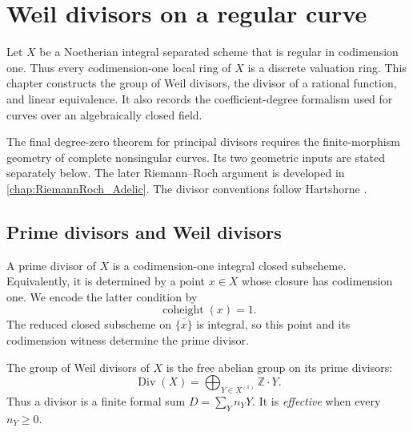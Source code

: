 \chapter{Weil divisors on a regular curve}
\label{chap:RiemannRoch_WeilDivisor}

Let \(X\) be a Noetherian integral separated scheme that is regular in
codimension one.  Thus every codimension-one local ring of \(X\) is a
discrete valuation ring.  This chapter constructs the group of Weil
divisors, the divisor of a rational function, and linear equivalence.  It
also records the coefficient-degree formalism used for curves over an
algebraically closed field.

The final degree-zero theorem for principal divisors requires the
finite-morphism geometry of complete nonsingular curves.  Its two geometric
inputs are stated separately below.  The later Riemann--Roch argument is developed in
\cref{chap:RiemannRoch_Adelic}.
The divisor conventions follow Hartshorne \cite{hartshorne-ag}.

\section{Prime divisors and Weil divisors}

\begin{definition}
  \label{def:prime_divisor}
  \leanok

  A prime divisor of \(X\) is a codimension-one integral closed subscheme.
  Equivalently, it is determined by a point \(x\in X\) whose closure has
  codimension one.  We encode the latter condition by
  \[
    \operatorname{coheight}(x)=1.
  \]
  The reduced closed subscheme on \(\overline{\{x\}}\) is integral, so this
  point and its codimension witness determine the prime divisor.
\end{definition}

\begin{definition}
  \label{def:codim1_cycles}
  \leanok

  The group of Weil divisors of \(X\) is the free abelian group on its prime
  divisors:
  \[
    \operatorname{Div}(X)
      =\bigoplus_{Y\in X^{(1)}}\mathbb Z\cdot Y.
  \]
  Thus a divisor is a finite formal sum \(D=\sum_Y n_Y Y\).  It is
  \emph{effective} when every \(n_Y\geq 0\).
\end{definition}

